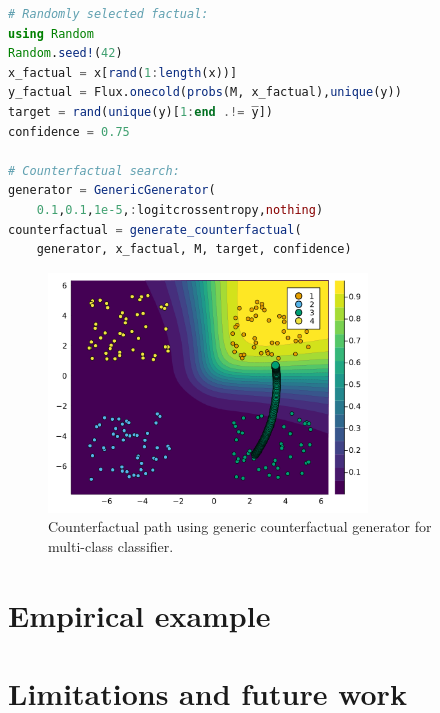 \documentclass[
  letterpaper,
  DIV=11,
  numbers=noendperiod]{scrartcl}
\begin{document}
\begin{lstlisting}[language = Julia]
# Randomly selected factual:
using Random
Random.seed!(42)
x_factual = x[rand(1:length(x))]
y_factual = Flux.onecold(probs(M, x_factual),unique(y))
target = rand(unique(y)[1:end .!= y̅]) 
confidence = 0.75

# Counterfactual search:
generator = GenericGenerator(
    0.1,0.1,1e-5,:logitcrossentropy,nothing)
counterfactual = generate_counterfactual(
    generator, x_factual, M, target, confidence)
\end{lstlisting}

\begin{figure}

{\centering \includegraphics[width=3.33333in,height=2.5in]{www/ce_multi.png}

}

\caption{\label{fig-multi}Counterfactual path using generic
counterfactual generator for multi-class classifier.}

\end{figure}

\hypertarget{empirical-example}{%
\section{Empirical example}\label{empirical-example}}

\hypertarget{limitations-and-future-work}{%
\section{Limitations and future
work}\label{limitations-and-future-work}}
\end{document}
